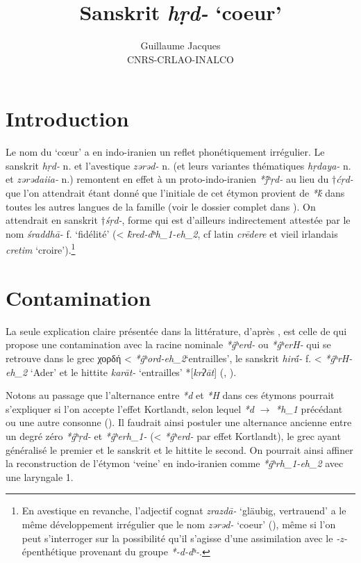 \documentclass{article}
\newcommand{\ipa}[1]{{\phon\textit{#1}}}
\newcommand{\grec}[1]{{\mleccha #1}}
\begin{document}
 
\title{Sanskrit \ipa{hṛd-} `coeur'}
\author{Guillaume Jacques\\ CNRS-CRLAO-INALCO}
\maketitle
\section*{Introduction}
Le nom du `cœur' a en indo-iranien un reflet phonétiquement irrégulier. Le sanskrit \ipa{hṛd-} n. et l'avestique \ipa{zərəd-} n. (et leurs variantes thématiques \ipa{hṛdaya-} n. et \ipa{zərədaiia-} n.) remontent en effet à un proto-indo-iranien \ipa{*j́ʰṛd-} au lieu du $\dagger$\ipa{ćṛd-} que l'on attendrait étant donné que l'initiale de cet étymon provient de \ipa{*ḱ} dans toutes les autres langues de la famille (voir le dossier complet dans \citealt[417-423]{wodtko08NIL}). On attendrait en sanskrit $\dagger$\ipa{śṛd-}, forme qui est d'ailleurs  indirectement attestée par le nom \ipa{śraddhā-} f. `fidélité' (< \ipa{k̂red-dʰh_1-eh_2}, cf latin \ipa{crēdere} et vieil irlandais \ipa{cretim} `croire').\footnote{En avestique en revanche, l'adjectif cognat \ipa{zrazdā-} `gläubig, vertrauend' a le même développement irrégulier que le nom \ipa{zərəd-} `coeur' (\citealt[663]{mayrhofer92ewa}), même si l'on peut s'interroger sur la possibilité qu'il s'agisse d'une assimilation avec le \ipa{-z-} épenthétique provenant du groupe \ipa{*-d-dʰ-}. }

\section{Contamination} \label{sec:hira}
La seule explication claire présentée dans la littérature, d'après \citet[420]{wodtko08NIL}, est celle de \citet{szemerenyi70heart} qui propose une contamination avec la racine nominale \ipa{*ĝʰerd-} ou \ipa{*ĝʰerH-} qui se retrouve dans le grec \grec{χορδή} < \ipa{*ĝʰord-eh_2}`entrailles', le sanskrit \ipa{hirā́-} f. < \ipa{*ĝʰrH-eh_2} `Ader' et le hittite \ipa{karāt-} `entrailles' *[\ipa{krʔāt}] (\citealt[208]{schrijver91laryngeals}, \citealt[446]{kloekhorst08edhil}).

Notons au passage que l'alternance entre \ipa{*d} et \ipa{*H} dans ces étymons pourrait s'expliquer si l'on accepte l'effet Kortlandt, selon lequel \ipa{*d} $\rightarrow$ \ipa{*h_1} précédant ou une autre consonne (\citealt{kortlandt83numerals, garnier14kortlandt}). Il faudrait ainsi postuler une alternance ancienne entre un degré zéro \ipa{*ĝʰṛd-} et  \ipa{*ĝʰerh_1-} (< \ipa{*ĝʰerd-} par effet Kortlandt), le grec ayant généralisé le premier et le sanskrit et le hittite le second. On pourrait ainsi affiner la reconstruction de l'étymon `veine' en indo-iranien comme \ipa{*ĝʰrh_1-eh_2} avec une laryngale 1.
\end{document}
